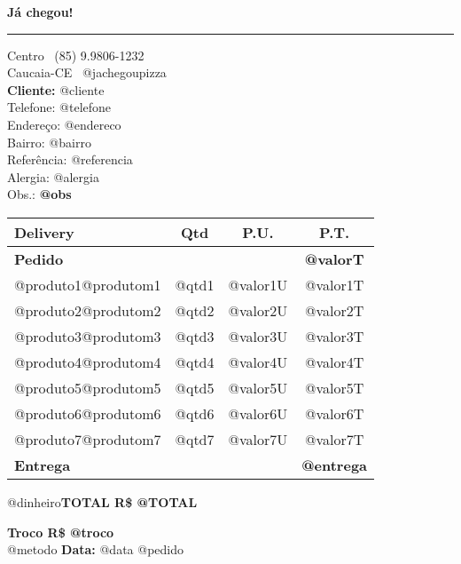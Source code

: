 \documentclass{article}
\begin{document}
\hfil{\large \bf Já chegou!}\hfil %
\smallskip\break %
\hrule %

\noindent Centro \hfill\faWhatsapp\ (85) 9.9806-1232 \\ %
Caucaia-CE \hfill\faInstagram\ @jachegoupizza
\\ 

{\bf \noindent Cliente:} @cliente \\ %
\noindent Telefone: @telefone \\ %
Endereço: @endereco \\
Bairro: @bairro \\
Referência: @referencia \\
Alergia: @alergia \\
Obs.: \textbf{@obs}\\

\begin{table}[!h]
    \centering
    \begin{tabularx}{\textwidth}{Xccc}
    \hline \textbf{Delivery\hfill} & \textbf{Qtd} & \textbf{P.U.} & \textbf{P.T.} \\
    \hline  \textbf{Pedido}     &       &          & \textbf{@valorT}  \\
            @produto1@produtom1 & @qtd1 & @valor1U & @valor1T \\
            @produto2@produtom2 & @qtd2 & @valor2U & @valor2T \\
            @produto3@produtom3 & @qtd3 & @valor3U & @valor3T \\
            @produto4@produtom4 & @qtd4 & @valor4U & @valor4T \\
            @produto5@produtom5 & @qtd5 & @valor5U & @valor5T \\
            @produto6@produtom6 & @qtd6 & @valor6U & @valor6T \\
            @produto7@produtom7 & @qtd7 & @valor7U & @valor7T \\
            \textbf{Entrega}    &       &          & \textbf{@entrega} \\ \hline
    \end{tabularx}
\end{table}
@dinheiro\hfill{\textbf{TOTAL R\$ @TOTAL}}

\hfill{\textbf{Troco R\$ @troco}}\\
\noindent @metodo
\vfill {\noindent \bf Data:} @data \hfill @pedido
\end{document}
